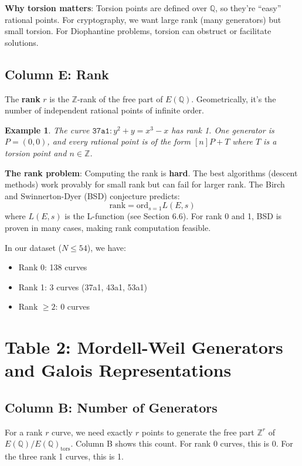 \documentclass[11pt]{article}
\newtheorem{example}[theorem]{Example}
\begin{document}
\textbf{Why torsion matters}: Torsion points are defined over $\mathbb{Q}$, so they're ``easy'' rational points. For cryptography, we want large rank (many generators) but small torsion. For Diophantine problems, torsion can obstruct or facilitate solutions.

\subsection{Column E: Rank}

The \textbf{rank} $r$ is the $\mathbb{Z}$-rank of the free part of $E(\mathbb{Q})$. Geometrically, it's the number of independent rational points of infinite order.

\begin{example}
The curve $\texttt{37a1}: y^2 + y = x^3 - x$ has rank 1. One generator is $P = (0, 0)$, and every rational point is of the form $[n]P + T$ where $T$ is a torsion point and $n \in \mathbb{Z}$.
\end{example}

\textbf{The rank problem}: Computing the rank is \textbf{hard}. The best algorithms (descent methods) work provably for small rank but can fail for larger rank. The Birch and Swinnerton-Dyer (BSD) conjecture predicts:
$$\text{rank} = \text{ord}_{s=1} L(E, s)$$
where $L(E, s)$ is the L-function (see Section 6.6). For rank 0 and 1, BSD is proven in many cases, making rank computation feasible.

In our dataset ($N \leq 54$), we have:
\begin{itemize}
\item Rank 0: 138 curves
\item Rank 1: 3 curves (37a1, 43a1, 53a1)
\item Rank $\geq 2$: 0 curves
\end{itemize}

\section{Table 2: Mordell-Weil Generators and Galois Representations}

\subsection{Column B: Number of Generators}

For a rank $r$ curve, we need exactly $r$ points to generate the free part $\mathbb{Z}^r$ of $E(\mathbb{Q})/E(\mathbb{Q})_{\text{tors}}$. Column B shows this count. For rank 0 curves, this is 0. For the three rank 1 curves, this is 1.
\end{document}
